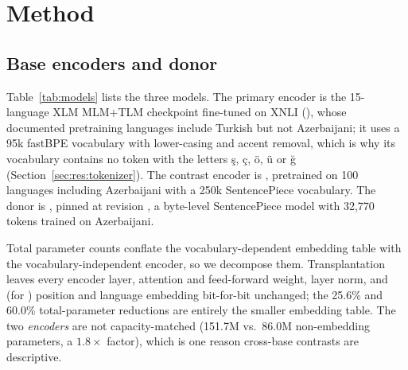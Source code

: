 \section{Method}
\label{sec:method}

\subsection{Base encoders and donor}
\label{sec:method:models}
Table~\ref{tab:models} lists the three models. The primary encoder is the 15-language XLM MLM+TLM checkpoint fine-tuned on XNLI (), whose documented pretraining languages include Turkish but not Azerbaijani; it uses a 95k fastBPE vocabulary with lower-casing and accent removal, which is why its vocabulary contains no token with the letters ş, ç, ö, ü or ğ (Section~\ref{sec:res:tokenizer}). The contrast encoder is , pretrained on 100 languages including Azerbaijani with a 250k SentencePiece vocabulary. The donor is , pinned at revision , a byte-level SentencePiece model with 32{,}770 tokens trained on Azerbaijani.

Total parameter counts conflate the vocabulary-dependent embedding table with the vocabulary-independent encoder, so we decompose them. Transplantation leaves every encoder layer, attention and feed-forward weight, layer norm, and (for \xlmxv) position and language embedding bit-for-bit unchanged; the 25.6\% and 60.0\% total-parameter reductions are entirely the smaller embedding table. The two \emph{encoders} are not capacity-matched (151.7M vs.\ 86.0M non-embedding parameters, a $1.8\times$ factor), which is one reason cross-base contrasts are descriptive.

